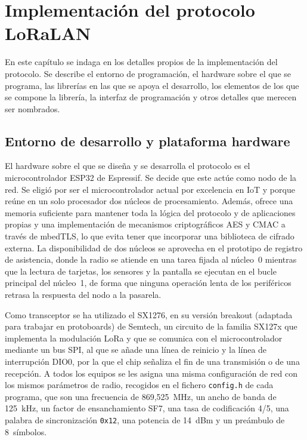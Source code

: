 \chapter{Implementación del protocolo LoRaLAN}\label{chap:5}

En este capítulo se indaga en los detalles propios de la implementación del protocolo. Se describe el entorno de programación, el hardware sobre el que se programa, las librerías en las que se apoya el desarrollo, los elementos de los que se compone la librería, la interfaz de programación y otros detalles que merecen ser nombrados.

\section{Entorno de desarrollo y plataforma hardware}\label{sec:entorno}

El hardware sobre el que se diseña y se desarrolla el protocolo es el microcontrolador ESP32 de Espressif. Se decide que este actúe como nodo de la red. Se eligió por ser el microcontrolador actual por excelencia en IoT y porque reúne en un solo procesador dos núcleos de procesamiento. Además, ofrece una memoria suficiente para mantener toda la lógica del protocolo y de aplicaciones propias y una implementación de mecanismos criptográficos AES y CMAC a través de mbedTLS, lo que evita tener que incorporar una biblioteca de cifrado externa. La disponibilidad de dos núcleos se aprovecha en el prototipo de registro de asistencia, donde la radio se atiende en una tarea fijada al núcleo~0 mientras que la lectura de tarjetas, los sensores y la pantalla se ejecutan en el bucle principal del núcleo~1, de forma que ninguna operación lenta de los periféricos retrasa la respuesta del nodo a la pasarela.

Como transceptor se ha utilizado el SX1276, en su versión breakout (adaptada para trabajar en protoboards) de Semtech, un circuito de la familia SX127x que implementa la modulación LoRa y que se comunica con el microcontrolador mediante un bus SPI, al que se añade una línea de reinicio y la línea de interrupción DIO0, por la que el chip señaliza el fin de una transmisión o de una recepción. A todos los equipos se les asigna una misma configuración de red con los mismos parámetros de radio, recogidos en el fichero \texttt{config.h} de cada programa, que son una frecuencia de 869,525~MHz, un ancho de banda de 125~kHz, un factor de ensanchamiento SF7, una tasa de codificación 4/5, una palabra de sincronización \texttt{0x12}, una potencia de 14~dBm y un preámbulo de 8~símbolos.

